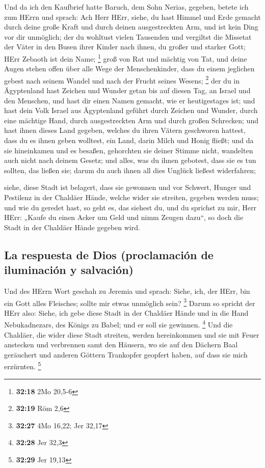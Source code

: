  Und da ich den Kaufbrief hatte Baruch, dem Sohn Nerias,
gegeben, betete ich zum HErrn und sprach:  Ach Herr HErr,
siehe, du hast Himmel und Erde gemacht durch deine große Kraft und durch
deinen ausgestreckten Arm, und ist kein Ding vor dir unmöglich;
 der du wohltust vielen Tausenden und vergiltst die
Missetat der Väter in den Busen ihrer Kinder nach ihnen, du großer und
starker Gott; HErr Zebaoth ist dein Name; \footnote{\textbf{32:18} 2Mo
  20,5-6}  groß von Rat und mächtig von Tat, und deine
Augen stehen offen über alle Wege der Menschenkinder, dass du einem
jeglichen gebest nach seinem Wandel und nach der Frucht seines Wesens;
\footnote{\textbf{32:19} Röm 2,6}  der du in Ägyptenland
hast Zeichen und Wunder getan bis auf diesen Tag, an Israel und den
Menschen, und hast dir einen Namen gemacht, wie er heutigestages ist;
 und hast dein Volk Israel aus Ägyptenland geführt durch
Zeichen und Wunder, durch eine mächtige Hand, durch ausgestreckten Arm
und durch großen Schrecken;  und hast ihnen dieses Land
gegeben, welches du ihren Vätern geschworen hattest, dass du es ihnen
geben wolltest, ein Land, darin Milch und Honig fließt; 
und da sie hineinkamen und es besaßen, gehorchten sie deiner Stimme
nicht, wandelten auch nicht nach deinem Gesetz; und alles, was du ihnen
gebotest, dass sie es tun sollten, das ließen sie; darum du auch ihnen
all dies Unglück ließest widerfahren;

 siehe, diese Stadt ist belagert, dass sie gewonnen und
vor Schwert, Hunger und Pestilenz in der Chaldäer Hände, welche wider
sie streiten, gegeben werden muss; und wie du geredet hast, so geht es,
das siehest du,  und du sprichst zu mir, Herr HErr:
„Kaufe du einen Acker um Geld und nimm Zeugen dazu``, so doch die Stadt
in der Chaldäer Hände gegeben wird.

\hypertarget{la-respuesta-de-dios-proclamaciuxf3n-de-iluminaciuxf3n-y-salvaciuxf3n}{%
\subsection{La respuesta de Dios (proclamación de iluminación y
salvación)}\label{la-respuesta-de-dios-proclamaciuxf3n-de-iluminaciuxf3n-y-salvaciuxf3n}}

 Und des HErrn Wort geschah zu Jeremia und sprach:
 Siehe, ich, der HErr, bin ein Gott alles Fleisches;
sollte mir etwas unmöglich sein? \footnote{\textbf{32:27} 4Mo 16,22; Jer
  32,17}  Darum so spricht der HErr also: Siehe, ich gebe
diese Stadt in der Chaldäer Hände und in die Hand Nebukadnezars, des
Königs zu Babel; und er soll sie gewinnen. \footnote{\textbf{32:28} Jer
  32,3}  Und die Chaldäer, die wider diese Stadt
streiten, werden hereinkommen und sie mit Feuer anstecken und verbrennen
samt den Häusern, wo sie auf den Dächern Baal geräuchert und anderen
Göttern Trankopfer geopfert haben, auf dass sie mich erzürnten.
\footnote{\textbf{32:29} Jer 19,13}

